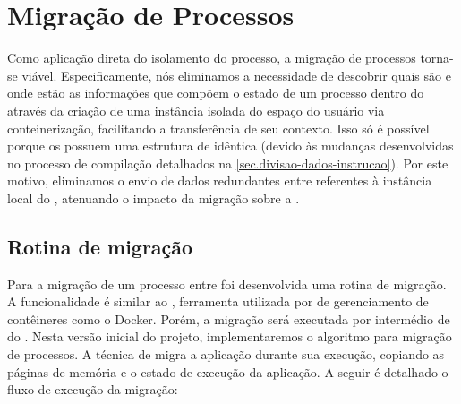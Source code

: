 \section{Migração de Processos}
\label{sec.migracao}

Como aplicação direta do isolamento do processo, a migração de processos torna-se viável. Especificamente, nós eliminamos a necessidade de descobrir quais são e onde estão as informações que compõem o estado de um processo dentro do \nanvix através da criação de uma instância isolada do espaço do usuário via conteinerização, facilitando a transferência de seu contexto. Isso só é possível porque os \clusters possuem uma estrutura de  idêntica (devido às mudanças desenvolvidas no processo de compilação detalhados na \autoref{sec.divisao-dados-instrucao}). Por este motivo, eliminamos o envio de dados redundantes entre \clusters referentes à instância local do \os, atenuando o impacto da migração sobre a \noc.

\subsection{Rotina de migração}
\label{sec.rotina-migracao}

Para a migração de um processo entre \clusters foi desenvolvida uma rotina de migração. A funcionalidade é similar ao \criu, ferramenta utilizada por \softwares de gerenciamento de contêineres como o Docker. Porém, a migração será executada por intermédio de \daemons do \os. Nesta versão inicial do projeto, implementaremos o algoritmo \hotmigration para migração de processos. A técnica de \hotmigration migra a aplicação durante sua execução, copiando as páginas de memória e o estado de execução da aplicação. A seguir é detalhado o fluxo de execução da migração:

